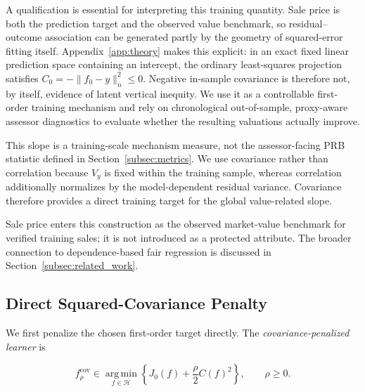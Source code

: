 \documentclass[10pt]{article}
\theoremstyle{definition}
\newcommand{\1}{\mathbf{1}}
\newcommand{\Hcal}{\mathcal{H}}
\newcommand{\argminop}{\operatorname*{arg\,min}}
\newcommand{\newtext}[1]{\textcolor{impGreen}{#1}}
\begin{document}
\newtext{A qualification is essential for interpreting this training quantity. Sale price is both the prediction target and the observed value benchmark, so residual--outcome association can be generated partly by the geometry of squared-error fitting itself. Appendix~\ref{app:theory} makes this explicit: in an exact fixed linear prediction space containing an intercept, the ordinary least-squares projection satisfies $C_0=-\|f_0-y\|_n^2\leq0$. Negative in-sample covariance is therefore not, by itself, evidence of latent vertical inequity. We use it as a controllable first-order training mechanism and rely on chronological out-of-sample, proxy-aware assessor diagnostics to evaluate whether the resulting valuations actually improve.}

{This slope is a training-scale mechanism measure, not the assessor-facing PRB statistic defined in Section~\ref{subsec:metrics}. We use covariance rather than correlation because $V_y$ is fixed within the training sample, whereas correlation additionally normalizes by the model-dependent residual variance. Covariance therefore provides a direct training target for the global value-related slope.}

{Sale price enters this construction as the observed market-value benchmark for verified training sales; it is not introduced as a protected attribute. The broader connection to dependence-based fair regression is discussed in Section~\ref{subsec:related_work}.}


\subsection{{Direct Squared-Covariance Penalty}}
\label{subsec:direct_penalty}

{We first penalize the chosen first-order target directly. The \emph{covariance-penalized learner} is}


{
\begin{equation}
\label{eq:direct_penalty}
f_\rho^{\mathrm{cov}}
\in
\argminop_{f\in\Hcal}
\left\{
J_0(f)+\frac{\rho}{2}C(f)^2
\right\},
\qquad
\rho\geq 0.
\end{equation}
}
\end{document}
